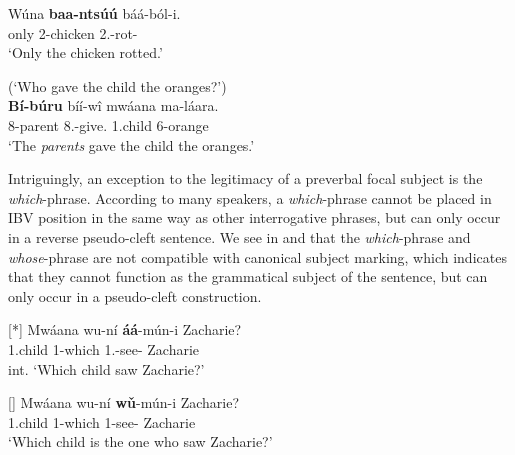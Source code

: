 \documentclass[output=paper,colorlinks,citecolor=brown,
]{langscibook}
\begin{document}
\begin{exe}
\ex
\label{36}
\gll
Wúna	\textbf{baa-ntsúú}	báá-ból-i.\\
only	2-chicken	2\Sm{}.\Pst{}-rot-\Pst{}\\
\trans ‘Only the chicken rotted.’

\end{exe}
\begin{exe}
\ex
\label{37}
(`Who gave the child the oranges?')\\
\gll
\textbf{Bí-búru} bíí-wî mwáana ma-láara.\\
8-parent 8\Sm{}.\Pst{}-give.\Pst{} 1.child 6-orange\\
\trans ‘The \textit{parents} gave the child the oranges.’


\end{exe}
Intriguingly, an exception to the legitimacy of a preverbal focal subject is the \textit{which}-phrase. According to many speakers, a \textit{which}-phrase cannot be placed in IBV position in the same way as other interrogative phrases, but can only occur in a reverse pseudo-cleft sentence. We see in  and  that the \textit{which}-phrase and \textit{whose}-phrase are not compatible with canonical subject marking, which indicates that they cannot function as the grammatical subject of the sentence, but can only occur in a pseudo-cleft construction. 
\begin{exe}
    \ex \label{38}
    \begin{xlist}
\ex
[*]{
\label{38a}
\gll
Mw\'{a}ana wu-ní \textbf{áá}-mún-i Zacharie?\\
1.child 1-which 1\Sm{}.\Pst{}-see-\Pst{} Zacharie\\
\trans int. ‘Which child saw Zacharie?’
}

\ex
[]{
\label{38b}
\gll
Mw\'{a}ana wu-ní \textbf{wǔ}-mún-i Zacharie?\\
1.child 1-which 1\Rel{}-see-\Pst{} Zacharie\\
\trans ‘Which child is the one who saw Zacharie?’
}

    \end{xlist}
\end{exe}
\end{document}
